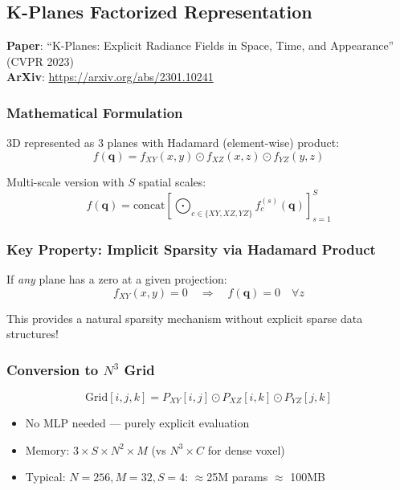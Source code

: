 \documentclass[11pt, a4paper]{article}
\begin{document}
\subsection{K-Planes Factorized Representation}

\textbf{Paper}: ``K-Planes: Explicit Radiance Fields in Space, Time, and Appearance'' (CVPR 2023)\\
\textbf{ArXiv}: \url{https://arxiv.org/abs/2301.10241}

\subsubsection{Mathematical Formulation}

3D represented as 3 planes with Hadamard (element-wise) product:
\begin{equation}
    f(\mathbf{q}) = f_{XY}(x,y) \odot f_{XZ}(x,z) \odot f_{YZ}(y,z)
\end{equation}

Multi-scale version with $S$ spatial scales:
\begin{equation}
    f(\mathbf{q}) = \text{concat}\left[\bigodot_{c \in \{XY,XZ,YZ\}} f_c^{(s)}(\mathbf{q})\right]_{s=1}^{S}
\end{equation}

\subsubsection{Key Property: Implicit Sparsity via Hadamard Product}

If \emph{any} plane has a zero at a given projection:
\begin{equation}
    f_{XY}(x,y) = 0 \quad \Rightarrow \quad f(\mathbf{q}) = 0 \quad \forall z
\end{equation}

This provides a natural sparsity mechanism without explicit sparse data structures!

\subsubsection{Conversion to $N^3$ Grid}

\begin{equation}
    \text{Grid}[i,j,k] = P_{XY}[i,j] \odot P_{XZ}[i,k] \odot P_{YZ}[j,k]
\end{equation}

\begin{itemize}
    \item No MLP needed --- purely explicit evaluation
    \item Memory: $3 \times S \times N^2 \times M$ (vs $N^3 \times C$ for dense voxel)
    \item Typical: $N=256, M=32, S=4$: $\approx$25M params $\approx$ 100MB
\end{itemize}
\end{document}

